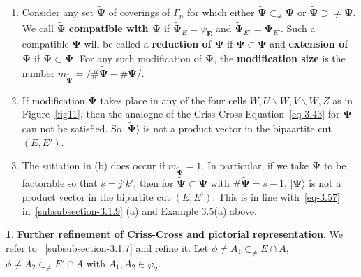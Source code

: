 \documentclass[a4paper,12pt]{article}
\theoremstyle{definition}
\theoremstyle{underlinethm}
\theoremstyle{definition}
\newtheorem{subsubsec}{}[subsection]
\begin{document}
\begin{enumerate}[label =(\alph*)]
\item Consider any set $\boldsymbol{\widetilde{\Psi}}$ of coverings of $\Gamma_{n}$ for which either $\boldsymbol{\widetilde{\Psi}} \subset_{\neq} \boldsymbol{\Psi}$ or $\boldsymbol{\widetilde{\Psi}} \supset\neq \boldsymbol{\Psi}$. We call $\boldsymbol{\widetilde{\Psi}}$ \textbf{compatible with $\boldsymbol{{\Psi}}$} if $\boldsymbol{\widetilde{\Psi}}_{E}= \psi_{\boldsymbol{E}}$ and $\boldsymbol{\widetilde{\Psi}}_{E'} = \boldsymbol{\Psi}_{E'}$. Such a compatible $\boldsymbol{\widetilde{\Psi}}$ will be called a \textbf{reduction of $\boldsymbol{\Psi}$} if $\boldsymbol{\widetilde{\Psi}} \subset \boldsymbol{\Psi}$ and \textbf{extension of} $\boldsymbol{\Psi}$ if $\boldsymbol{\Psi} \subset \boldsymbol{\widetilde{\Psi}}$. For any such modification of $\boldsymbol{\Psi}$, the \textbf{modification size} is the number $m_{\boldsymbol{\widetilde{\Psi}}} = / \# \boldsymbol{\widetilde{\Psi}} - \# \boldsymbol{\Psi}/$.

\item If modification $\boldsymbol{\widetilde{\Psi}}$ takes place in any of the four cells $W, U \smallsetminus W, V\smallsetminus W, Z$ as in Figure~\eqref{fig11}, then the analogne of the Criss-Cross Equation~\eqref{eq-3.43} for $\boldsymbol{\Psi}$ can not be satisfied. So $| \boldsymbol{\widetilde{\Psi}} \rangle$ is not a product vector in the bipaartite cut $(E, E')$.

\item The sutiation in (b) does occur if $m_{\boldsymbol{\widetilde{\Psi}}} =1$. In particular, if we take $\boldsymbol{\Psi}$ to be factorable so that $s=j'k'$, then for $\boldsymbol{\widetilde{\Psi}} \subset \boldsymbol{\Psi}$ with $\# \boldsymbol{\widetilde{\Psi}} = s-1$, $| \boldsymbol{\Psi} \rangle$ is not a product vector in the bipartite cut $(E, E')$. This is in line with~\eqref{eq-3.57} in~\eqref{subsubsection-3.1.9} (a) and Example 3.5(a) above.
\end{enumerate}

\begin{subsubsec}\label{subsubsection-3.1.11}
\textbf{Further refinement of Criss-Cross and pictorial representation}. We refer to ~\eqref{subsubsection-3.1.7} and refine it. Let $\phi\neq A_{1} \subset_{\neq} E \cap A$, $\phi \neq A_{2} \subset_{\neq} E' \cap A$ with $A_{1}, A_{2} \in \varphi_{2}$.
\end{subsubsec}
\end{document}
